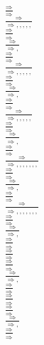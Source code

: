 \documentclass[11pt]{article}
\begin{document}
\begin{center}
\bigskip
\\$\frac{\Rightarrow }{\Rightarrow }$
\bigskip
\\$\frac{\Rightarrow }{\Rightarrow , , , , , }$
\bigskip
\\$\frac{\Rightarrow }{\Rightarrow }$
\bigskip
\\$\frac{\Rightarrow }{\Rightarrow , }$
\bigskip
\\$\frac{\Rightarrow }{\Rightarrow }$
\bigskip
\\$\frac{\Rightarrow }{\Rightarrow , , , , , }$
\bigskip
\\$\frac{\Rightarrow }{\Rightarrow }$
\bigskip
\\$\frac{\Rightarrow }{\Rightarrow , }$
\bigskip
\\$\frac{\Rightarrow }{\Rightarrow }$
\bigskip
\\$\frac{\Rightarrow }{\Rightarrow , , , , , }$
\bigskip
\\$\frac{\Rightarrow }{\Rightarrow }$
\bigskip
\\$\frac{\Rightarrow }{\Rightarrow , }$
\bigskip
\\$\frac{\Rightarrow }{\Rightarrow }$
\bigskip
\\$\frac{\Rightarrow }{\Rightarrow , , , , , , , }$
\bigskip
\\$\frac{\Rightarrow }{\Rightarrow }$
\bigskip
\\$\frac{\Rightarrow }{\Rightarrow , }$
\bigskip
\\$\frac{\Rightarrow }{\Rightarrow }$
\bigskip
\\$\frac{\Rightarrow }{\Rightarrow , , , , , , , }$
\bigskip
\\$\frac{\Rightarrow }{\Rightarrow }$
\bigskip
\\$\frac{\Rightarrow }{\Rightarrow , }$
\bigskip
\\$\frac{\Rightarrow }{\Rightarrow }$
\bigskip
\\$\frac{\Rightarrow }{\Rightarrow }$
\bigskip
\\$\frac{\Rightarrow }{\Rightarrow }$
\bigskip
\\$\frac{\Rightarrow }{\Rightarrow , }$
\bigskip
\\$\frac{\Rightarrow }{\Rightarrow }$
\bigskip
\\$\frac{\Rightarrow }{\Rightarrow }$
\bigskip
\\$\frac{\Rightarrow }{\Rightarrow }$
\bigskip
\\$\frac{\Rightarrow }{\Rightarrow , }$
\bigskip
\\$\frac{\Rightarrow }{\Rightarrow }$
\bigskip

\end{center}
\end{document}
